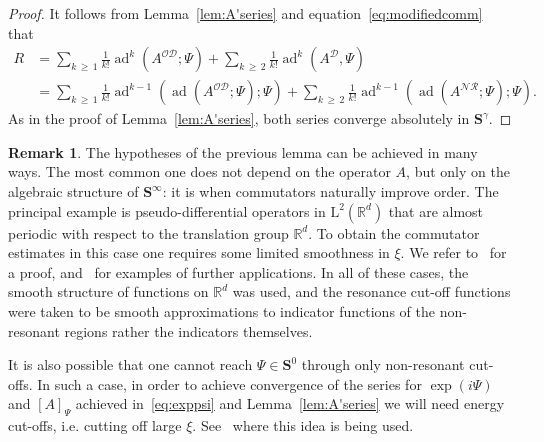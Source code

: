\documentclass[10pt]{amsart}
\theoremstyle{definition}\newtheorem{defi}[theo]{Definition}\newtheorem{rema}[theo]{Remark}\newtheorem{exam}[theo]{Example}\newtheorem{nota}[theo]{Notation}
\DeclareMathOperator{\ad}{ad}
\newcommand{\RL}{\mathrm{L}}
\newcommand{\R}{\mathbb R}
\newcommand{\CD}{\mathcal{D}}
\newcommand{\CN}{\mathcal{N}}
\newcommand{\CO}{\mathcal{O}}
\newcommand{\CR}{\mathcal{R}}
\newcommand{\CNR}{{\CN\!\CR}}
\newcommand{\BS}{\mathbf S}
\begin{document}
\begin{proof}
It follows from Lemma~\ref{lem:A'series} and equation~\eqref{eq:modifiedcomm} that
\begin{equation}
\begin{aligned}
R &= \sum_{k\,\ge\,1} \frac{1}{k!} \ad^k\left(A^{\CO\CD};\Psi\right) + \sum_{k\,\ge\,2} \frac{1}{k!} \ad^{k}\left(A^{\CD},\Psi\right) \\
&= \sum_{k\,\ge\,1} \frac{1}{k!} \ad^{k-1}\left(\ad\left(A^{\CO\CD};\Psi\right);\Psi\right) + \sum_{k\,
\ge\,2} \frac{1}{k!} \ad^{k-1}\left(\ad\left(A^{\CNR};\Psi\right);\Psi\right).
\end{aligned}
\end{equation}
As in the proof of Lemma~\ref{lem:A'series}, both series converge absolutely in $\BS^{\gamma}$.
\end{proof}

\begin{rema}
The hypotheses of the previous lemma can be achieved in many ways. The most common one does not depend on the operator $A$, but only on the algebraic structure of $\BS^\infty$: it is when commutators naturally improve order. The principal example is pseudo-differential operators in $\RL^2(\R^d)$ that are almost periodic with respect to the translation group $\R^d$. To obtain the commutator estimates in this case one requires some limited smoothness in $\xi$. We refer to~\cite[Lemma~3.4]{Sobolev2005} for a proof, and~\cite{MorParSht2014,
ParSob2010,ParSht2012,
ParSht2016,Sobolev2006} for examples of further applications. In all of these cases, the smooth structure of functions on $\R^d$ was used, and the resonance cut-off functions were taken to be smooth approximations to indicator functions of the non-resonant regions rather the indicators themselves.

It is also possible that one cannot reach $\Psi \in \BS^0$ through only non-resonant cut-offs. In such a case, in order to achieve convergence of the series for $\exp(i\Psi)$ and $[A]_\Psi$ achieved in~\eqref{eq:exppsi} and Lemma~\ref{lem:A'series} we will need energy cut-offs, i.e. cutting off large $\xi$. See~\cite{MorParSht2014,ParSob2010} where this idea is being used.
\end{rema}
\end{document}
